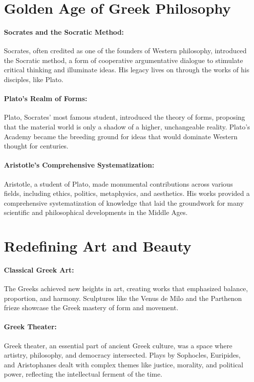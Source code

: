 \documentclass[a4paper,12pt]{book}
\begin{document}
\section*{Golden Age of Greek Philosophy}

\paragraph{Socrates and the Socratic Method:}
Socrates, often credited as one of the founders of Western philosophy, introduced the Socratic method, a form of cooperative argumentative dialogue to stimulate critical thinking and illuminate ideas. His legacy lives on through the works of his disciples, like Plato.

\paragraph{Plato’s Realm of Forms:}
Plato, Socrates’ most famous student, introduced the theory of forms, proposing that the material world is only a shadow of a higher, unchangeable reality. Plato’s Academy became the breeding ground for ideas that would dominate Western thought for centuries.

\paragraph{Aristotle’s Comprehensive Systematization:}
Aristotle, a student of Plato, made monumental contributions across various fields, including ethics, politics, metaphysics, and aesthetics. His works provided a comprehensive systematization of knowledge that laid the groundwork for many scientific and philosophical developments in the Middle Ages.

\section*{Redefining Art and Beauty}

\paragraph{Classical Greek Art:}
The Greeks achieved new heights in art, creating works that emphasized balance, proportion, and harmony. Sculptures like the Venus de Milo and the Parthenon frieze showcase the Greek mastery of form and movement.

\paragraph{Greek Theater:}
Greek theater, an essential part of ancient Greek culture, was a space where artistry, philosophy, and democracy intersected. Plays by Sophocles, Euripides, and Aristophanes dealt with complex themes like justice, morality, and political power, reflecting the intellectual ferment of the time.
\end{document}
